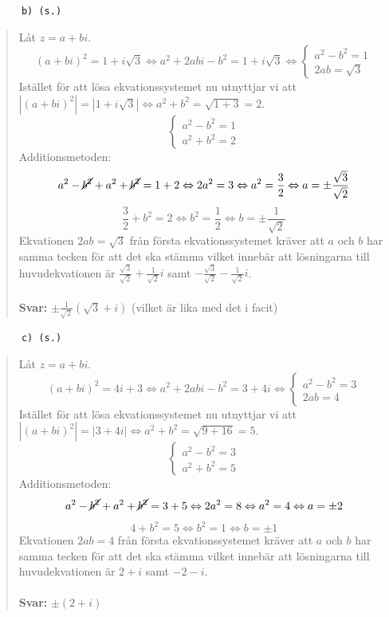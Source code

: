 \documentclass[a4paper]{article}
\newcommand{\tskcol}[1]{\textcolor{tskcol}{#1}}
\begin{document}
	\texttt{\tskcol{~~~~~~b) (s.)}}
	\begin{quotation}
		\noindent
		Låt $z=a+bi$.
		\[(a+bi)^2=1+i\sqrt{3} \Leftrightarrow
		a^2+2abi-b^2=1+i\sqrt{3} \Leftrightarrow
		\begin{cases}
		a^2-b^2=1 \\
		2ab=\sqrt{3}
		\end{cases}\]
		Istället för att lösa ekvationssystemet nu utnyttjar vi  att $|(a+bi)^2|=|1+i\sqrt{3}| \Leftrightarrow a^2+b^2=\sqrt{1+3}=2$.
		\[\begin{cases}
		a^2-b^2 = 1 \\
		a^2+b^2 = 2
		\end{cases}\]
		Additionsmetoden:
		\[a^2-\cancel{b^2}+a^2+\cancel{b^2} = 1+2 \Leftrightarrow
		2a^2=3 \Leftrightarrow
		a^2=\frac{3}{2} \Leftrightarrow
		a=\pm\frac{\sqrt{3}}{\sqrt{2}}\]
		\[\frac{3}{2}+b^2=2 \Leftrightarrow
		b^2=\frac{1}{2} \Leftrightarrow
		b=\pm \frac{1}{\sqrt{2}}\]
		Ekvationen $2ab=\sqrt{3}$ från första ekvationssystemet kräver att $a$ och $b$ har samma tecken för att det ska stämma vilket innebär att lösningarna till huvudekvationen är $\frac{\sqrt{3}}{\sqrt{2}}+\frac{1}{\sqrt{2}}i$ samt $-\frac{\sqrt{3}}{\sqrt{2}}-\frac{1}{\sqrt{2}}i$.
		\\ \\
		\textbf{Svar:} $\pm\frac{1}{\sqrt{2}}(\sqrt{3}+i)$ (vilket är lika med det i facit)
	\end{quotation}
	
	\texttt{\tskcol{~~~~~~c) (s.)}}
	\begin{quotation}
		\noindent
		Låt $z=a+bi$.
		\[(a+bi)^2=4i+3 \Leftrightarrow
		a^2+2abi-b^2=3+4i\Leftrightarrow
		\begin{cases}
		a^2-b^2=3 \\
		2ab=4
		\end{cases}\]
		Istället för att lösa ekvationssystemet nu utnyttjar vi  att $|(a+bi)^2|=|3+4i| \Leftrightarrow a^2+b^2=\sqrt{9+16}=5$.
		\[\begin{cases}
		a^2-b^2 = 3 \\
		a^2+b^2 = 5
		\end{cases}\]
		Additionsmetoden:
		\[a^2-\cancel{b^2}+a^2+\cancel{b^2} = 3+5 \Leftrightarrow
		2a^2=8 \Leftrightarrow
		a^2=4 \Leftrightarrow
		a=\pm2\]
		\[4+b^2=5 \Leftrightarrow
		b^2=1 \Leftrightarrow
		b=\pm 1\]
		Ekvationen $2ab=4$ från första ekvationssystemet kräver att $a$ och $b$ har samma tecken för att det ska stämma vilket innebär att lösningarna till huvudekvationen är $2+i$ samt $-2-i$.
		\\ \\
		\textbf{Svar:} $\pm(2+i)$
	\end{quotation}
	
\end{document}
